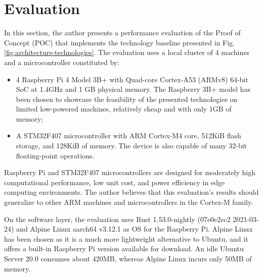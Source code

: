 
\section{Evaluation}
\label{sec:evaluation}

In this section, the author presents a performance evaluation of the Proof of Concept (POC) that implements the technology baseline presented in Fig. \ref{fig:architecture-technologies}. The evaluation uses a local cluster of 4 machines and a microcontroller constituted by:

\begin{itemize}
    \item 4 Raspberry Pi 4 Model 3B+ with Quad-core Cortex-A53 (ARMv8) 64-bit SoC at 1.4GHz and 1 GB physical memory. The Raspberry 3B+ model has been chosen to showcase the feasibility of the presented technologies on limited low-powered machines, relatively cheap and with only 1GB of memory;
    \item A STM32F407 microcontroller with ARM Cortex-M4 core, 512KiB flash storage, and 128KiB of memory. The device is also capable of many 32-bit floating-point operations.
\end{itemize}

Raspberry Pi and STM32F407 microcontrollers are designed for moderately high computational performance, low unit cost, and power efficiency in edge computing environments. The author believes that this evaluation's results should generalize to other ARM machines and microcontrollers in the Cortex-M family.

On the software layer, the evaluation uses Rust 1.53.0-nightly (07e0e2ec2 2021-03-24) and Alpine Linux aarch64 v3.12.1 as OS for the Raspberry Pi. Alpine Linux has been chosen as it is a much more lightweight alternative to Ubuntu, and it offers a built-in Raspberry Pi version available for download. An idle Ubuntu Server 20.0 consumes about 420MB, whereas Alpine Linux incurs only 50MB of memory.

